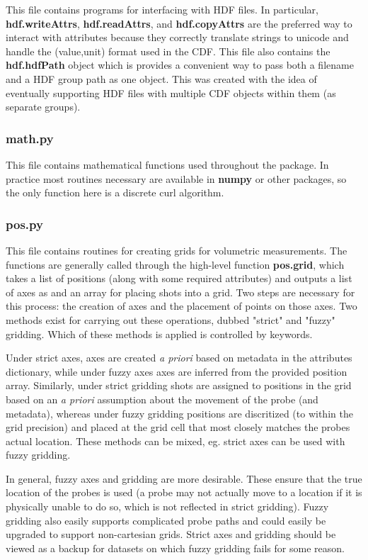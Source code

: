 \documentclass[12pt]{article}
\newcommand{\loc}[1]{{\bf \fontfamily{pcr}\selectfont #1}}
\begin{document}
This file contains programs for interfacing with HDF files. In particular, \loc{hdf.writeAttrs}, \loc{hdf.readAttrs}, and \loc{hdf.copyAttrs} are the preferred way to interact with attributes because they correctly translate strings to unicode and handle the (value,unit) format used in the CDF. This file also contains the \loc{hdf.hdfPath} object which is provides a convenient way to pass both a filename and a HDF group path as one object. This was created with the idea of eventually supporting HDF files with multiple CDF objects within them (as separate groups).

\subsubsection{\loc{math.py}}

This file contains mathematical functions used throughout the package. In practice most routines necessary are available in \loc{numpy} or other packages, so the only function here is a discrete curl algorithm.

\subsubsection{\loc{pos.py}}

This file contains routines for creating grids for volumetric measurements. The functions are generally called through the high-level function \loc{pos.grid}, which takes a list of positions (along with some required attributes) and outputs a list of axes as and an array for placing shots into a grid. Two steps are necessary for this process: the creation of axes and the placement of points on those axes. Two methods exist for carrying out these operations, dubbed "strict" and "fuzzy" gridding. Which of these methods is applied is controlled by keywords.

Under strict axes, axes are created \textit{a priori} based on metadata in the attributes dictionary, while under fuzzy axes axes are inferred from the provided position array. Similarly, under strict gridding shots are assigned to positions in the grid based on an \textit{a priori} assumption about the movement of the probe (and metadata), whereas under fuzzy gridding positions are discritized (to within the grid precision) and placed at the grid cell that most closely matches the probes actual location. These methods can be mixed, eg. strict axes can be used with fuzzy gridding. 

In general, fuzzy axes and gridding are more desirable. These ensure that the true location of the probes is used (a probe may not actually move to a location if it is physically unable to do so, which is not reflected in strict gridding). Fuzzy gridding also easily supports complicated probe paths and could easily be upgraded to support non-cartesian grids. Strict axes and gridding should be viewed as a backup for datasets on which fuzzy gridding fails for some reason.
\end{document}
